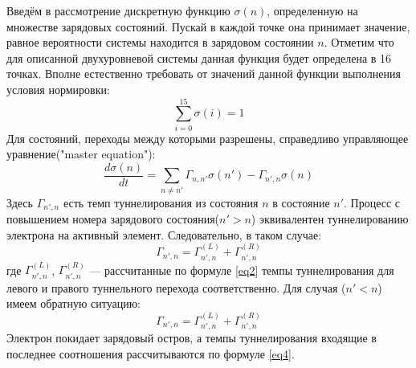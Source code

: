 \documentclass[12pt,a4paper]{report}
\begin{document}
Введём в рассмотрение дискретную функцию $\sigma(n)$, определенную на множестве зарядовых состояний. Пускай в каждой точке она принимает значение, равное вероятности системы находится в зарядовом состоянии $n$. Отметим что для описанной двухуровневой системы данная функция будет определена в 16 точках. Вполне естественно требовать от значений данной функции выполнения условия нормировки:
\begin{equation}\label{norm}
\sum\limits_{i=0}^{15}\sigma(i) = 1
\end{equation}
Для состояний, переходы между которыми разрешены, справедливо управляющее уравнение("master equation"):
\begin{equation}\label{master}
\frac{d\sigma(n)}{dt} = \sum_{n \neq n'} \Gamma_{n,n'} \sigma(n') - \Gamma_{n',n} \sigma(n)
\end{equation}
Здесь $\Gamma_{n',n}$ есть темп туннелирования из состояния $n$ в состояние $n'$. Процесс с повышением номера зарядового состояния($n' > n$) эквивалентен туннелированию электрона на активный элемент. Следовательно, в таком случае:
\begin{equation}
\Gamma_{n',n} = \Gamma_{n',n}^{(L)} + \Gamma_{n',n}^{(R)}
\end{equation}
где $\Gamma_{n',n}^{(L)}$, $\Gamma_{n',n}^{(R)}$ — рассчитанные по формуле \ref{eq2} темпы туннелирования для левого и правого туннельного перехода соответственно. Для случая ($n' < n$) имеем обратную ситуацию:
\begin{equation}
\Gamma_{n',n} = \Gamma_{n',n}^{(L)} + \Gamma_{n',n}^{(R)}
\end{equation}
Электрон покидает зарядовый остров, а темпы туннелирования входящие в последнее соотношения рассчитываются по формуле \ref{eq4}.
\end{document}
